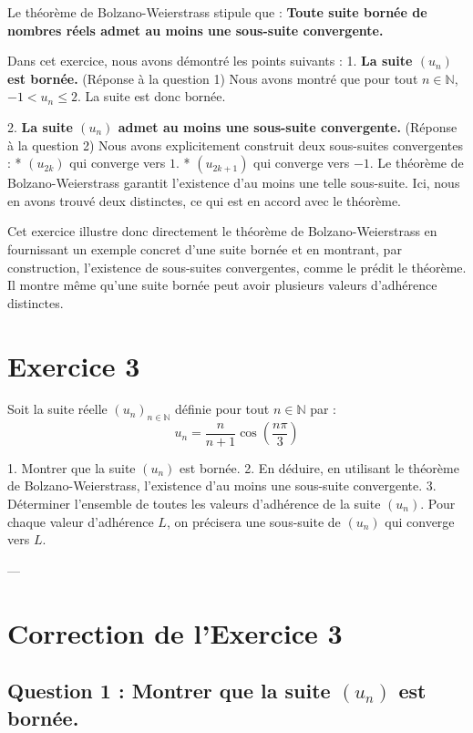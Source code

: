 \documentclass{report}
\begin{document}
Le théorème de Bolzano-Weierstrass stipule que :
\textbf{Toute suite bornée de nombres réels admet au moins une sous-suite convergente.}

Dans cet exercice, nous avons démontré les points suivants :
1.  \textbf{La suite $(u_n)$ est bornée.} (Réponse à la question 1)
    Nous avons montré que pour tout $n \in \mathbb{N}$, $-1 < u_n \le 2$. La suite est donc bornée.

2.  \textbf{La suite $(u_n)$ admet au moins une sous-suite convergente.} (Réponse à la question 2)
    Nous avons explicitement construit deux sous-suites convergentes :
    *   $(u_{2k})$ qui converge vers $1$.
    *   $(u_{2k+1})$ qui converge vers $-1$.
    Le théorème de Bolzano-Weierstrass garantit l'existence d'au moins une telle sous-suite. Ici, nous en avons trouvé deux distinctes, ce qui est en accord avec le théorème.

Cet exercice illustre donc directement le théorème de Bolzano-Weierstrass en fournissant un exemple concret d'une suite bornée et en montrant, par construction, l'existence de sous-suites convergentes, comme le prédit le théorème. Il montre même qu'une suite bornée peut avoir plusieurs valeurs d'adhérence distinctes.

\newpage


\chapter*{Exercice 3}

Soit la suite réelle $(u_n)_{n \in \mathbb{N}}$ définie pour tout $n \in \mathbb{N}$ par :
$$u_n = \frac{n}{n+1} \cos\left(\frac{n\pi}{3}\right)$$

1.  Montrer que la suite $(u_n)$ est bornée.
2.  En déduire, en utilisant le théorème de Bolzano-Weierstrass, l'existence d'au moins une sous-suite convergente.
3.  Déterminer l'ensemble de toutes les valeurs d'adhérence de la suite $(u_n)$. Pour chaque valeur d'adhérence $L$, on précisera une sous-suite de $(u_n)$ qui converge vers $L$.

---

\chapter*{Correction de l'Exercice 3}

\section*{Question 1 : Montrer que la suite $(u_n)$ est bornée.}
\end{document}
